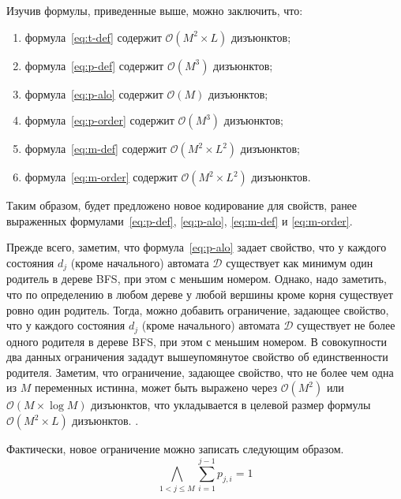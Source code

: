 Изучив формулы, приведенные выше, можно заключить, что:
\begin{enumerate}
  \item формула~\eqref{eq:t-def} содержит $\mathcal{O}\left(M^{2} \times L\right)$ дизъюнктов;
  \item формула~\eqref{eq:p-def} содержит $\mathcal{O}\left(M^{3}\right)$ дизъюнктов;
  \item формула~\eqref{eq:p-alo} содержит $\mathcal{O}\left(M\right)$ дизъюнктов;
  \item формула~\eqref{eq:p-order} содержит $\mathcal{O}\left(M^{3}\right)$ дизъюнктов;
  \item формула~\eqref{eq:m-def} содержит $\mathcal{O}\left(M^{2} \times L^{2}\right)$ дизъюнктов;
  \item формула~\eqref{eq:m-order} содержит $\mathcal{O}\left(M^{2} \times L^{2}\right)$ дизъюнктов.
\end{enumerate}
%
Таким образом, будет предложено новое кодирование для свойств, ранее выраженных формулами~\eqref{eq:p-def}, \eqref{eq:p-alo}, \eqref{eq:m-def} и \eqref{eq:m-order}.

Прежде всего, заметим, что формула~\eqref{eq:p-alo} задает свойство, что у каждого состояния $d_{j}$ (кроме начального) автомата $\mathcal{D}$ существует как минимум один родитель в дереве BFS, при этом с меньшим номером.
Однако, надо заметить, что по определению в любом дереве у любой вершины кроме корня существует ровно один родитель.
Тогда, можно добавить ограничение, задающее свойство, что у каждого состояния $d_{j}$ (кроме начального) автомата $\mathcal{D}$ существует не более одного родителя в дереве BFS, при этом с меньшим номером.
В совокупности два данных ограничения зададут вышеупомянутое свойство об единственности родителя.
Заметим, что ограничение, задающее свойство, что не более чем одна из $M$ переменных истинна, может быть выражено через $\mathcal{O}\left(M^2\right)$ или $\mathcal{O}\left(M\times \log M\right)$ дизъюнктов, что укладывается в целевой размер формулы $\mathcal{O}\left(M^{2} \times L\right)$ дизъюнктов.
.

Фактически, новое ограничение можно записать следующим образом.
\begin{equation}
\label{eq:p-sum-eq-one}
  \bigwedge_{1 < j \leq M} \sum_{i=1}^{j-1}p_{j,i}=1
\end{equation}


